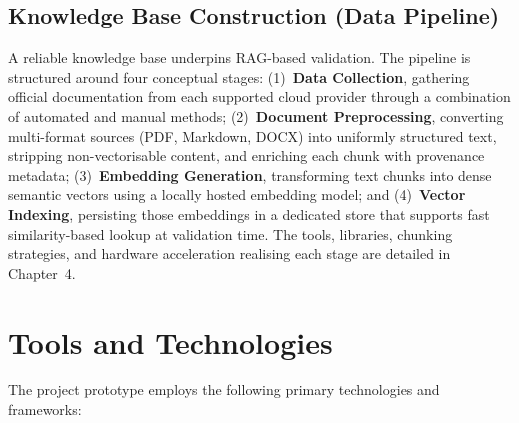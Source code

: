 \subsection{Knowledge Base Construction (Data Pipeline)}

A reliable knowledge base underpins RAG-based validation. The pipeline is structured around four conceptual stages: (1)~\textbf{Data Collection}, gathering official documentation from each supported cloud provider through a combination of automated and manual methods; (2)~\textbf{Document Preprocessing}, converting multi-format sources (PDF, Markdown, DOCX) into uniformly structured text, stripping non-vectorisable content, and enriching each chunk with provenance metadata; (3)~\textbf{Embedding Generation}, transforming text chunks into dense semantic vectors using a locally hosted embedding model; and (4)~\textbf{Vector Indexing}, persisting those embeddings in a dedicated store that supports fast similarity-based lookup at validation time. The tools, libraries, chunking strategies, and hardware acceleration realising each stage are detailed in Chapter~4.

\section{Tools and Technologies}

The project prototype employs the following primary technologies and frameworks:

